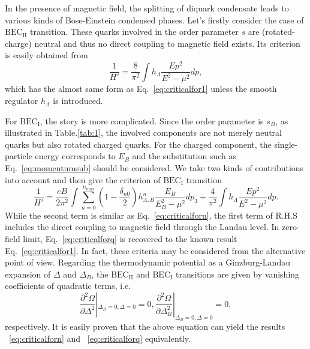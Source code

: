 \documentclass[prd, showpacs,nofootinbib,amsmath,amssymb,12pt]{revtex4}
\begin{document}
In the presence of magnetic field, the splitting of diquark condensate leads to various kinds of Bose-Einstein condensed phases.
Let's firstly consider the case of $\text{BEC}_\text{II}$ transition. These quarks involved in the order parameter $s$ 
are (rotated-charge) neutral and thus no direct coupling to magnetic field exists.
Its criterion is easily obtained from
\begin{equation}
\label{eq:criticalforn}
\frac{1}{H'} =\frac{8}{ \pi^2} \int h_\Lambda  \frac{ E p^2}{E^2 - \mu^2} dp,
\end{equation}
which has the almost same form as Eq.~\eqref{eq:criticalfor1} unless the smooth regulator $h_\Lambda$ is introduced.

For $\text{BEC}_\text{I}$, the story is more complicated. Since the order parameter is $s_B$, as illustrated in Table.\ref{tab:1}, the involved components are not merely neutral quarks but also rotated charged quarks.
For the charged component, the single-particle energy corresponds to $E_B$ and the substitution such as Eq.~\eqref{eq:momentumsub} should be considered.
We take two kinds of contributions into account and then give the criterion of $\text{BEC}_\text{I}$ transition
\begin{equation}
\label{eq:criticalforq}
\frac{1}{H'}  =
 \frac{eB}{2\pi^2} \int \sum_{n=0}^{n_{max}} (1 -\frac{\delta_{n0}}{2}) h_{\Lambda, B}^n
\frac{E_B}{E_B^2 -\mu^2 } dp_3 + \frac{4}{ \pi^2} \int  h_{\Lambda}
\frac{Ep^2 }{E^2 - \mu^2} dp.
\end{equation}
While the second term is similar as Eq.~\eqref{eq:criticalforn}, the first term of R.H.S includes the direct coupling to magnetic field through the Landau level. 
In zero-field limit,  Eq.~\ref{eq:criticalforq} is recovered to the known result Eq.~\eqref{eq:criticalfor1}.
In fact, these criteria may be considered from the alternative point of view. 
Regarding the thermodynamic potential as a Ginzburg-Landau expansion of $\Delta$ and $\Delta_B$,
the $\text{BEC}_\text{II}$ and $\text{BEC}_\text{I}$ transitions are given by vanishing coefficients of quadratic terms, i.e.\begin{equation}
  \frac{\partial^2\Omega}{\partial \Delta^2}|_{\Delta_B =0,\Delta =0} =0 ,\frac{\partial^2\Omega}{\partial \Delta_{B}^2}|_{\Delta_B =0,\Delta =0} =0,
\end{equation}
respectively. It is easily proven that the above equation can yield the results ~\eqref{eq:criticalforn} and ~\eqref{eq:criticalforq} equivalently. 
\end{document}
